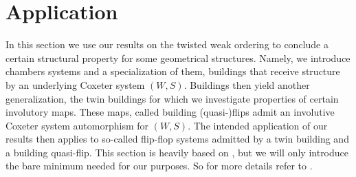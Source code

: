 \chapter{Application}
\label{sec:application}

In this section we use our results on the twisted weak ordering to conclude a certain structural property for some geometrical structures. Namely, we introduce chambers systems and a specialization of them, buildings that receive structure by an underlying Coxeter system $(W,S)$. Buildings then yield another generalization, the twin buildings for which we investigate properties of certain involutory maps. These maps, called building (quasi-)flips admit an involutive Coxeter system automorphism for $(W,S)$. The intended application of our results then applies to so-called flip-flop systems admitted by a twin building and a building quasi-flip. This section is heavily based on \cite{horn:kac-moody}, but we will only introduce the bare minimum needed for our purposes. So for more details refer to \cite{horn:kac-moody}.




